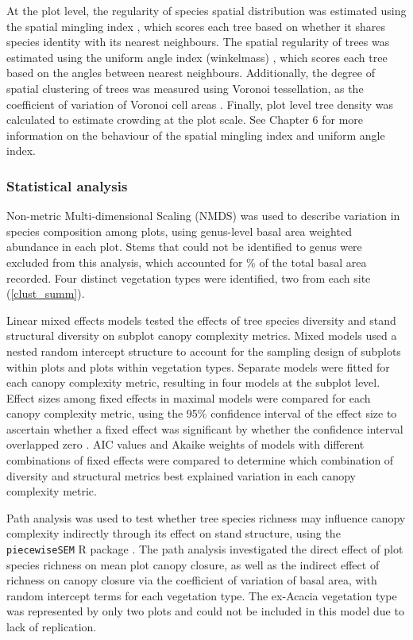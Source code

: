 \documentclass[11pt,a4paper]{article}
\begin{document}
At the plot level, the regularity of species spatial distribution was estimated using the spatial mingling index \citep{Gadow2002}, which scores each tree based on whether it shares species identity with its nearest neighbours. The spatial regularity of trees was estimated using the uniform angle index (winkelmass) \citep{Gadow2002}, which scores each tree based on the angles between nearest neighbours. Additionally, the degree of spatial clustering of trees was measured using Voronoi tessellation, as the coefficient of variation of Voronoi cell areas \citep{Ong2012}. Finally, plot level tree density was calculated to estimate crowding at the plot scale. See Chapter 6 for more information on the behaviour of the spatial mingling index and uniform angle index.

\subsubsection{Statistical analysis}

Non-metric Multi-dimensional Scaling (NMDS) was used to describe variation in species composition among plots, using genus-level basal area weighted abundance in each plot. Stems that could not be identified to genus were excluded from this analysis, which accounted for \perIndet{}\% of the total basal area recorded. Four distinct vegetation types were identified, two from each site (\autoref{clust_summ}). 

Linear mixed effects models tested the effects of tree species diversity and stand structural diversity on subplot canopy complexity metrics. Mixed models used a nested random intercept structure to account for the sampling design of subplots within plots and plots within vegetation types. Separate models were fitted for each canopy complexity metric, resulting in four models at the subplot level. Effect sizes among fixed effects in maximal models were compared for each canopy complexity metric, using the 95\% confidence interval of the effect size to ascertain whether a fixed effect was significant by whether the confidence interval overlapped zero \citep{Nakagawa2007}. AIC values and Akaike weights of models with different combinations of fixed effects were compared to determine which combination of diversity and structural metrics best explained variation in each canopy complexity metric. 

Path analysis was used to test whether tree species richness may influence canopy complexity indirectly through its effect on stand structure, using the \texttt{piecewiseSEM} R package \citep{piecewiseSEM}. The path analysis investigated the direct effect of plot species richness on mean plot canopy closure, as well as the indirect effect of richness on canopy closure via the coefficient of variation of basal area, with random intercept terms for each vegetation type. The ex-Acacia vegetation type was represented by only two plots and could not be included in this model due to lack of replication.
\end{document}
